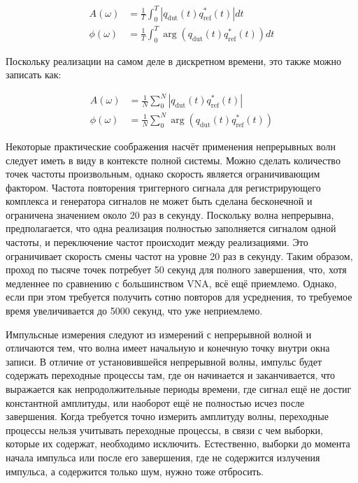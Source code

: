 \documentclass{report}
\begin{document}
\begin{align}
A(\omega) &= \frac{1}{T} \int_{0}^{T} \left| q_\text{dut}(t) q^*_\text{ref}(t) \right| dt \\
\phi(\omega) &= \frac{1}{T} \int_{0}^{T} \arg\left( q_\text{dut}(t) q^*_\text{ref}(t) \right) dt
\end{align}

Поскольку реализации на самом деле в дискретном времени, это также можно записать как:

\begin{align}
A(\omega) &= \frac{1}{N} \sum_{0}^{N} \left| q_\text{dut}(t) q^*_\text{ref}(t) \right| \\
\phi(\omega) &= \frac{1}{N} \sum_{0}^{N} \arg\left( q_\text{dut}(t) q^*_\text{ref}(t) \right)
\end{align}

Некоторые практические соображения насчёт применения непрерывных волн следует иметь в виду в контексте полной системы. Можно сделать количество точек частоты произвольным, однако скорость является ограничивающим фактором. Частота повторения триггерного сигнала для регистрирующего комплекса и генератора сигналов не может быть сделана бесконечной и ограничена значением около 20 раз в секунду. Поскольку волна непрерывна, предполагается, что одна реализация полностью заполняется сигналом одной частоты, и переключение частот происходит между реализациями. Это ограничивает скорость смены частот на уровне 20 раз в секунду. Таким образом, проход по тысяче точек потребует 50 секунд для полного завершения, что, хотя медленнее по сравнению с большинством VNA, всё ещё приемлемо. Однако, если при этом требуется получить сотню повторов для усреднения, то требуемое время увеличивается до 5000 секунд, что уже неприемлемо.

Импульсные измерения следуют из измерений с непрерывной волной и отличаются тем, что волна имеет начальную и конечную точку внутри окна записи. В отличие от установившейся непрерывной волны, импульс будет содержать переходные процессы там, где он начинается и заканчивается, что выражается как непродолжительные периоды времени, где сигнал ещё не достиг константной амплитуды, или наоборот ещё не полностью исчез после завершения. Когда требуется точно измерить амплитуду волны, переходные процессы нельзя учитывать переходные процессы, в связи с чем выборки, которые их содержат, необходимо исключить. Естественно, выборки до момента начала импульса или после его завершения, где не содержится излучения импульса, а содержится только шум, нужно тоже отбросить.
\end{document}
